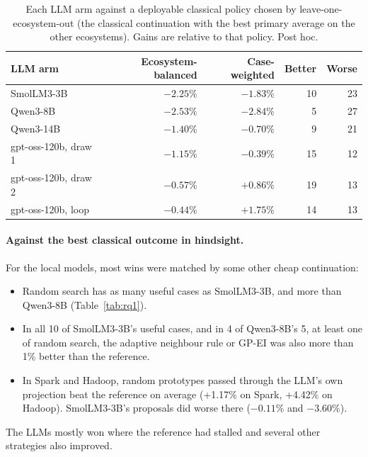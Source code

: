 \begin{table}[t]
\centering
\caption{Each LLM arm against a deployable classical policy chosen by leave-one-ecosystem-out (the classical continuation with the best primary average on the other ecosystems). Gains are relative to that policy. Post hoc.}
\label{tab:deployable}
\small
\begin{tabular}{lrrrr}
\toprule
LLM arm & Ecosystem-balanced & Case-weighted & Better & Worse \\
\midrule
SmolLM3-3B & $-2.25\%$ & $-1.83\%$ & 10 & 23 \\
Qwen3-8B & $-2.53\%$ & $-2.84\%$ & 5 & 27 \\
Qwen3-14B & $-1.40\%$ & $-0.70\%$ & 9 & 21 \\
gpt-oss-120b, draw 1 & $-1.15\%$ & $-0.39\%$ & 15 & 12 \\
gpt-oss-120b, draw 2 & $-0.57\%$ & $+0.86\%$ & 19 & 13 \\
gpt-oss-120b, loop & $-0.44\%$ & $+1.75\%$ & 14 & 13 \\
\bottomrule
\end{tabular}
\end{table}

\paragraph{Against the best classical outcome in hindsight.} For the local models, most wins were matched by some other cheap continuation:
\begin{itemize}
  \item Random search has as many useful cases as SmolLM3-3B, and more than Qwen3-8B (Table~\ref{tab:rq1}).
  \item In all 10 of SmolLM3-3B's useful cases, and in 4 of Qwen3-8B's 5, at least one of random search, the adaptive neighbour rule or GP-EI was also more than 1\% better than the reference.
  \item In Spark and Hadoop, random prototypes passed through the LLM's own projection beat the reference on average (+1.17\% on Spark, +4.42\% on Hadoop). SmolLM3-3B's proposals did worse there ($-0.11\%$ and $-3.60\%$).
\end{itemize}
The LLMs mostly won where the reference had stalled and several other strategies also improved.

